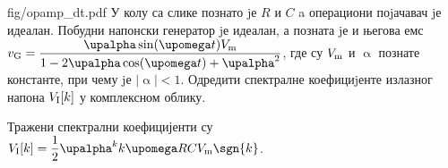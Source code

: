 \begin{slikaDesno}[.833]{fig/opamp_dt.pdf}
    \PID 
    У колу са слике познато jе $R$ и $C$ a операциони поjачавач jе идеалан. 
    Побудни напонски генератор jе идеалан, а позната jе и његова
    емс 
    $v_{\rm G} = \dfrac{\upalpha \sin(\upomega t) V_{\rm m} }{1 - 2\upalpha \cos(\upomega t) + \upalpha^2}$, 
    где су $V_{\rm m}$ и $\upalpha$ познате константе, при
    чему jе $|\upalpha| < 1$. Одредити спектралне коефициjенте излазног напона 
    $V_{\rm I} [k]$ у комплексном облику.
\end{slikaDesno}

\REZULTAT 
Тражени спектрални коефицијенти су 
$V_{\rm I}[k] = \dfrac{1}{2} \upalpha^k k\upomega R C V_{\rm m} \sgn{k}$.